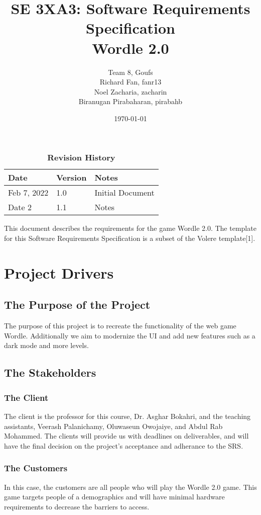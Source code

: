 \documentclass[12pt, titlepage]{article}
\title{SE 3XA3: Software Requirements Specification\\Wordle 2.0}
\author{Team 8, Goufs
		\\ Richard Fan, fanr13
		\\ Noel Zacharia, zacharin
		\\ Biranugan Pirabaharan, pirabahb
}
\date{\today}
\begin{document}
\maketitle

\tableofcontents
\listoftables
\listoffigures

\begin{table}[bp]
\caption{\bf Revision History}
\begin{tabularx}{\textwidth}{p{3cm}p{2cm}X}
\toprule {\bf Date} & {\bf Version} & {\bf Notes}\\
\midrule
Feb 7, 2022  & 1.0 & Initial Document\\
Date 2 & 1.1 & Notes\\
\bottomrule
\end{tabularx}
\end{table}

\newpage

This document describes the requirements for the game Wordle 2.0. The template 
for this Software Requirements Specification is a subset of the Volere 
template[1].


\section{Project Drivers}

\subsection{The Purpose of the Project}
The purpose of this project is to recreate the functionality of the web game Wordle. Additionally we aim to modernize the UI and add new features such as a dark mode and more levels.
\subsection{The Stakeholders}

\subsubsection{The Client}
The client is the professor for this course, Dr. Asghar Bokahri, and the 
teaching assistants, Veerash Palanichamy, Oluwaseun Owojaiye, and Abdul Rab 
Mohammed. The clients will provide us with deadlines on deliverables, and will 
have the final decision on the project's acceptance and adherance to the SRS. 

\subsubsection{The Customers}
In this case, the customers are all people who will play the Wordle 2.0 game. 
This game targets people of a demographics and will have minimal hardware 
requirements to decrease the barriers to access.
\end{document}
